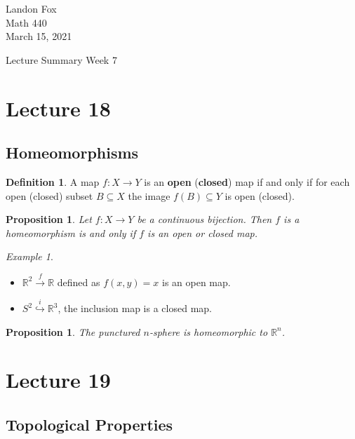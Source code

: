 \documentclass[ 12pt ]{article}
\newcounter{lecture_num}
\theoremstyle{plain}
\theoremstyle{plain}
\newtheorem{proposition}[theorem]{Proposition}
\theoremstyle{definition}
\newtheorem{definition}[theorem]{Definition}
\theoremstyle{remark}
\newtheorem{example}[theorem]{Example}
\begin{document}
\noindent Landon Fox \\
\noindent Math 440 \\
\noindent March 15, 2021

\begin{center}
	\Large Lecture Summary Week 7
\end{center}

\setcounter{lecture_num}{18}
\setcounter{theorem}{0}
\section*{Lecture 18}

\subsection*{Homeomorphisms}

\begin{definition}
	A map $f : X \to Y$ is an \textbf{open} (\textbf{closed}) map if and only if for each open (closed) subset $B \subseteq X$ the image $f(B) \subseteq Y$ is open (closed).
\end{definition}

\begin{proposition}
	Let $f : X \to Y$ be a continuous bijection. Then $f$ is a homeomorphism is and only if $f$ is an open or closed map.
\end{proposition}

\begin{example} $ $
	\begin{itemize}
		\item $\mathbb{R}^2 \overset{f}{\to} \mathbb{R}$ defined as $f(x, y) = x$ is an open map.
		\item $S^2 \overset{i}{\hookrightarrow} \mathbb{R}^3$, the inclusion map is a closed map.
	\end{itemize}
\end{example}

\begin{proposition}
	The punctured $n$-sphere is homeomorphic to $\mathbb{R}^n$.
\end{proposition}

\setcounter{lecture_num}{19}
\setcounter{theorem}{0}
\section*{Lecture 19}

\subsection*{Topological Properties}
\end{document}
